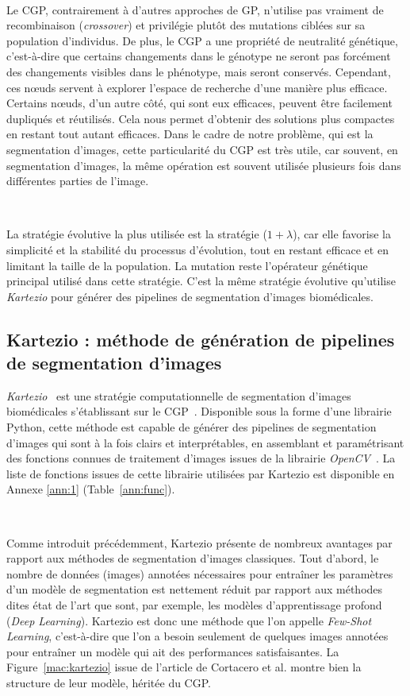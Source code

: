 \documentclass[a4paper,12pt]{report}
\newcommand{\figref}[1]{Figure~\ref{#1}}
\newcommand{\tabref}[1]{Table~\ref{#1}}
\begin{document}
\

Le CGP, contrairement à d'autres approches de GP, n'utilise pas vraiment de recombinaison (\textit{crossover}) et privilégie plutôt des mutations ciblées sur sa population d'individus. De plus, le CGP a une propriété de neutralité génétique, c'est-à-dire que certains changements dans le génotype ne seront pas forcément des changements visibles dans le phénotype, mais seront conservés. Cependant, ces nœuds servent à explorer l'espace de recherche d'une manière plus efficace. Certains nœuds, d'un autre côté, qui sont eux efficaces, peuvent être facilement dupliqués et réutilisés. Cela nous permet d'obtenir des solutions plus compactes en restant tout autant efficaces. Dans le cadre de notre problème, qui est la segmentation d'images, cette particularité du CGP est très utile, car souvent, en segmentation d'images, la même opération est souvent utilisée plusieurs fois dans différentes parties de l'image.

\

La stratégie évolutive la plus utilisée est la stratégie ($1+\lambda$), car elle favorise la simplicité et la stabilité du processus d'évolution, tout en restant efficace et en limitant la taille de la population. La mutation reste l'opérateur génétique principal utilisé dans cette stratégie. C'est la même stratégie évolutive qu'utilise \textit{Kartezio} pour générer des pipelines de segmentation d'images biomédicales.

\subsection{Kartezio : méthode de génération de pipelines de segmentation d'images}
\textit{Kartezio}~\cite{kartezio} est une stratégie computationnelle de segmentation d'images biomédicales s'établissant sur le CGP~\cite{cgp}. Disponible sous la forme d'une librairie Python, cette méthode est capable de générer des pipelines de segmentation d'images qui sont à la fois clairs et interprétables, en assemblant et paramétrisant des fonctions connues de traitement d'images issues de la librairie \textit{OpenCV}~\cite{opencv,opencv-python}. La liste de fonctions issues de cette librairie utilisées par Kartezio est disponible en Annexe \ref{ann:1} (\tabref{ann:func}).

\

Comme introduit précédemment, Kartezio présente de nombreux avantages par rapport aux méthodes de segmentation d'images classiques. Tout d'abord, le nombre de données (images) annotées nécessaires pour entraîner les paramètres d'un modèle de segmentation est nettement réduit par rapport aux méthodes dites état de l'art que sont, par exemple, les modèles d'apprentissage profond (\textit{Deep Learning}). Kartezio est donc une méthode que l'on appelle \textit{Few-Shot Learning}, c'est-à-dire que l'on a besoin seulement de quelques images annotées pour entraîner un modèle qui ait des performances satisfaisantes. La \figref{mac:kartezio} issue de l'article de Cortacero et al. \cite{kartezio} montre bien la structure de leur modèle, héritée du CGP.
\end{document}
